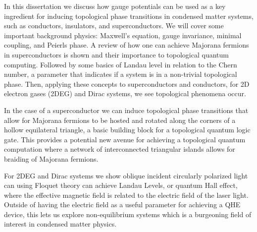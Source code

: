 In this dissertation we discuss how gauge potentials can be used as a key ingredient for inducing topological phase transitions in condensed matter systems, such as conductors, insulators, and superconductors.
We will cover some important background physics: Maxwell's equation, gauge invariance, minimal coupling, and Peierls phase.
A review of how one can achieve Majorana fermions in superconductors is shown and their importance to topological quantum computing.
Followed by some basics of Landau level in relation to the Chern number, a parameter that indicates if a system is in a non-trivial topological phase.
Then, applying these concepts to superconductors and conductors, for 2D electron gases (2DEG) and Dirac systems, we see topological phenomena occur.

In the case of a superconductor we can induce topological phase transitions that allow for Majorana fermions to be hosted and rotated along the corners of a hollow equilateral triangle, a basic building block for a topological quantum logic gate.
This provides a potential new avenue for achieving a topological quantum computation where a network of interconnected triangular islands allows for braiding of Majorana fermions.

For 2DEG and Dirac systems we show oblique incident circularly polarized light can using Floquet theory can achieve Landau Levels, or quantum Hall effect, where the effective magnetic field is related to the electric field of the laser light.
Outside of having the electric field as a useful parameter for achieving a QHE device, this lets us explore non-equilibrium systems which is a burgeoning field of interest in condensed matter physics.
